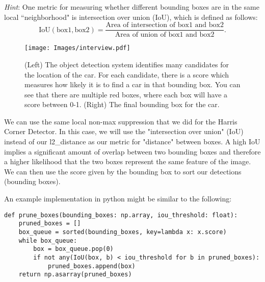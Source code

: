 \documentclass[answers]{exam}
\begin{document}
\emph{Hint}: One metric for measuring whether different bounding boxes are in the same local ``neighborhood" is intersection over union (IoU), which is defined as follows:
\begin{equation*}
\text{IoU}(\text{box1}, \text{box2}) = \frac{\text{Area of intersection of box1 and box2}}{\text{Area of union of box1 and box2}}.
\end{equation*}

\begin{figure}[H]
    \centering
    \texttt{[image: Images/interview.pdf]}
\caption{(Left) The object detection system identifies many candidates for the location of the car. For each candidate, there is a score which measures how likely it is to find a car in that bounding box. You can see that there are multiple red boxes, where each box will have a score between 0-1. (Right) The final bounding box for the car.}
\label{interview}
\end{figure}

\begin{solution}
We can use the same local non-max suppression that we did for the Harris Corner Detector. In this case, we will use the "intersection over union" (IoU) instead of our l2\_distance as our metric for "distance" between boxes. A high IoU implies a significant amount of overlap between two bounding boxes and therefore a higher likelihood that the two boxes represent the same feature of the image. We can then use the score given by the bounding box to sort our detections (bounding boxes).

An example implementation in python might be similar to the following:

\begin{verbatim}
def prune_boxes(bounding_boxes: np.array, iou_threshold: float):
    pruned_boxes = []
    box_queue = sorted(bounding_boxes, key=lambda x: x.score)
    while box_queue:
        box = box_queue.pop(0)
        if not any(IoU(box, b) < iou_threshold for b in pruned_boxes):
            pruned_boxes.append(box)
    return np.asarray(pruned_boxes)
    \end{verbatim}
\end{solution}
\end{document}
